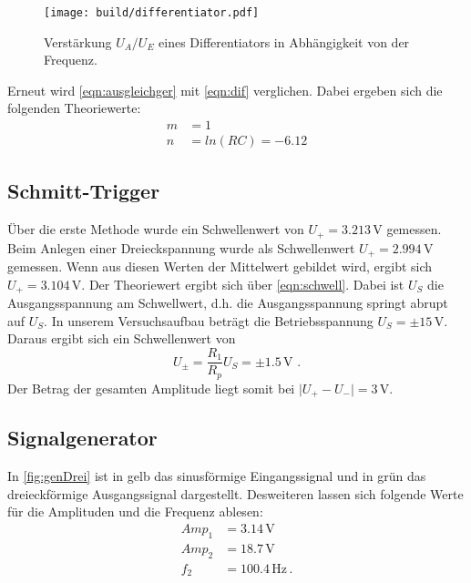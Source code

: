 \begin{figure}
    \centering
    \texttt{[image: build/differentiator.pdf]}
    \caption{Verstärkung $U_A/U_E$ eines Differentiators in Abhängigkeit von der Frequenz.}
    \label{fig:diffplot}
\end{figure}
Erneut wird \autoref{eqn:ausgleichger} mit \autoref{eqn:dif} verglichen. Dabei ergeben sich die folgenden Theoriewerte:
\begin{align*}
    m &= 1 \\
    n &= ln(RC) = -6.12
\end{align*}

\subsection{Schmitt-Trigger}
Über die erste Methode wurde ein Schwellenwert von $U_+=3.213 \,\unit{\volt}$ gemessen. Beim Anlegen einer Dreieckspannung wurde als Schwellenwert 
$U_+=2.994\,\unit{\volt}$ gemessen. Wenn aus diesen Werten der Mittelwert gebildet wird, ergibt sich $U_+=3.104\,\unit{\volt}$. Der Theoriewert 
ergibt sich über \autoref{eqn:schwell}. Dabei ist $U_S$ die Ausgangsspannung am Schwellwert, d.h. die Ausgangsspannung springt abrupt auf 
$U_S$. In unserem Versuchsaufbau beträgt die Betriebsspannung $U_S = \pm 15 \,\unit{\volt}$. Daraus ergibt sich ein Schwellenwert von 
\begin{equation*}
    U_{\pm} = \frac{R_1}{R_p}U_S = \pm 1.5\,\unit{\volt} \,\, .
\end{equation*}
Der Betrag der gesamten Amplitude liegt somit bei $\lvert U_+ - U_- \rvert = 3\,\unit{\volt}$.

\subsection{Signalgenerator}
In \autoref{fig:genDrei} ist in gelb das sinusförmige Eingangssignal und in grün das dreieckförmige Ausgangssignal dargestellt. 
Desweiteren lassen sich folgende Werte für die Amplituden und die Frequenz ablesen:
\begin{align*}
    Amp_1 &= 3.14 \,\unit{\volt} \\
    Amp_2 &= 18.7 \,\unit{\volt} \\
    f_2 &= 100.4 \,\unit{\hertz} \, .\\
\end{align*}

